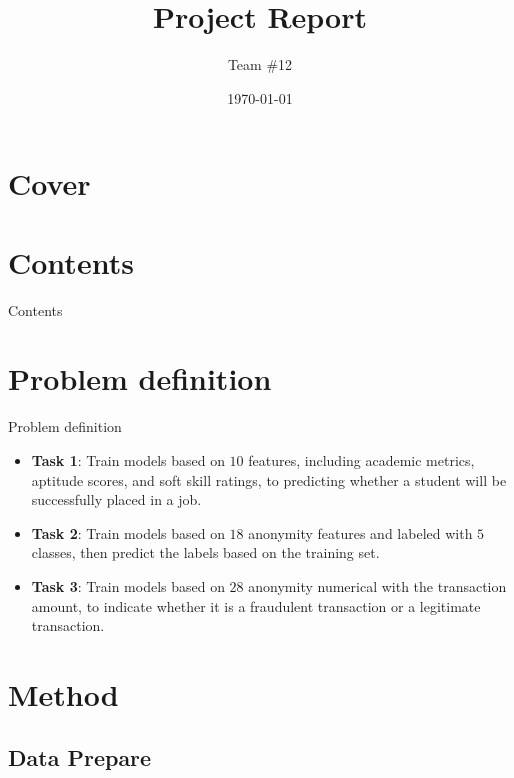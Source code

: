 \documentclass{beamer}
\title{Project Report}
\author{Team \#12}
\institute{
  \parbox{0.2\textwidth}{
    \centering WANG Zeyu \\
    \vspace{.25cm}
    \centering 24056788G
  }
  \parbox{0.2\textwidth}{
    \centering YANG Xirui \\
    \vspace{.25cm}
    \centering 24135668G
  }
  \parbox{0.2\textwidth}{
    \centering Wu Tianxiao \\
    \vspace{.25cm}
    \centering 24084591G
  }
}
\date{\today}
\begin{document}
\section*{Cover}
\frame{\titlepage}

\section*{Contents}
\begin{frame}{Contents}
  \tableofcontents
\end{frame}

\section{Problem definition}

\begin{frame}{Problem definition}

  \begin{itemize}
    \item \textbf{Task 1}: Train models based on $10$ features, including academic metrics, aptitude scores, and soft skill ratings, to predicting whether a student will be successfully placed in a job. \vspace{.25cm}
    \item \textbf{Task 2}: Train models based on $18$ anonymity features and labeled with $5$ classes, then predict the labels based on the training set. \vspace{.25cm}
    \item \textbf{Task 3}: Train models based on $28$ anonymity numerical with the transaction amount, to indicate whether it is a fraudulent transaction or a legitimate transaction. \vspace{.25cm}
  \end{itemize}

\end{frame}

\section{Method}

\subsection{Data Prepare}
\end{document}
